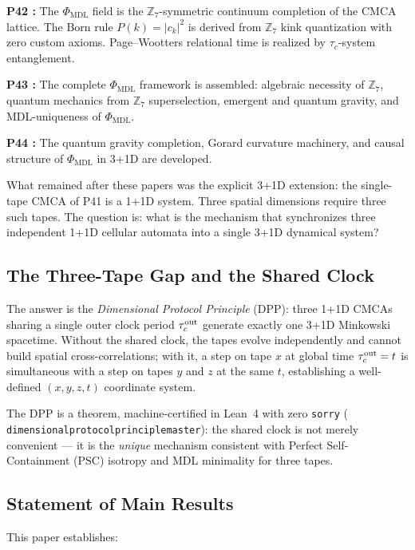 \documentclass[11pt]{article}
\theoremstyle{remark}
\newcommand{\PSC}{\text{PSC}}
\newcommand{\PHIMDL}{\Phi_{\mathrm{MDL}}}
\newcommand{\ZS}{\mathbb{Z}_7}
\newcommand{\lean}[1]{%
  \penalty-100
  \begingroup\def\_{\textunderscore\allowbreak}\texttt{#1}\endgroup}
\newcommand{\CMCA}{\text{CMCA}}
\newcommand{\tauc}{\tau_c}
\newcommand{\taucout}{\tau_c^{\rm out}}
\begin{document}
\textbf{P42 \cite{SpivackPhiMDLField}:} The $\PHIMDL$ field is the $\ZS$-symmetric
continuum completion of the $\CMCA$ lattice. The Born rule
$P(k) = |c_k|^2$ is derived from $\ZS$ kink quantization with zero custom
axioms. Page--Wootters relational time is realized by $\tauc$-system
entanglement.

\textbf{P43 \cite{SpivackCompleteness}:} The complete $\PHIMDL$ framework is
assembled: algebraic necessity of $\ZS$, quantum mechanics from $\ZS$
superselection, emergent and quantum gravity, and MDL-uniqueness of
$\PHIMDL$.

\textbf{P44 \cite{SpivackQGR}:} The quantum gravity completion, Gorard curvature machinery, and
causal structure of $\PHIMDL$ in 3+1D are developed.

What remained after these papers was the explicit 3+1D extension: the
single-tape $\CMCA$ of P41 is a 1+1D system. Three spatial dimensions require
three such tapes. The question is: what is the mechanism that synchronizes
three independent 1+1D cellular automata into a single 3+1D dynamical system?

\subsection{The Three-Tape Gap and the Shared Clock}

The answer is the \emph{Dimensional Protocol Principle} (DPP): three 1+1D
$\CMCA$s sharing a single outer clock period $\taucout$ generate exactly
one 3+1D Minkowski spacetime. Without the shared clock, the tapes evolve
independently and cannot build spatial cross-correlations; with it, a step on
tape $x$ at global time $\taucout = t$ is simultaneous with a step on tapes
$y$ and $z$ at the same $t$, establishing a well-defined $(x,y,z,t)$
coordinate system.

The DPP is a theorem, machine-certified in Lean~4 with zero \texttt{sorry}
(\lean{dimensional\_protocol\_principle\_master}): the shared clock is not
merely convenient — it is the \emph{unique} mechanism consistent with
Perfect Self-Containment ($\PSC$) isotropy and MDL minimality for three tapes.

\subsection{Statement of Main Results}

This paper establishes:
\end{document}
